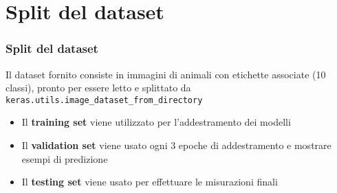 \documentclass{beamer}
\newcommand{\dflvspace}{\vspace{10pt}}
\begin{document}
\section{Split del dataset}
\begin{frame}
    \frametitle{Split del dataset}
    
    Il dataset fornito consiste in immagini di animali con etichette associate (10 classi),
    pronto per essere letto e splittato da \texttt{keras.utils.image\_dataset\_from\_directory}
    
    \dflvspace
    \dflvspace
    
    \begin{center}
    \end{center}
    
    \dflvspace
    \dflvspace
    
    \begin{itemize}
    	\item Il \textbf{training set} viene utilizzato per l'addestramento dei modelli
    	\item Il \textbf{validation set} viene usato ogni 3 epoche di addestramento e mostrare esempi di predizione
    	\item Il \textbf{testing set} viene usato per effettuare le misurazioni finali
    \end{itemize}
    
\end{frame}
\end{document}
